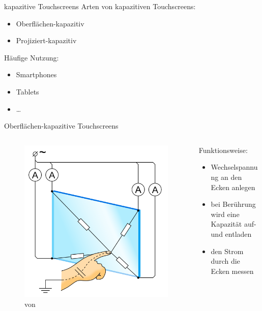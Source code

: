 \documentclass[12pt, aspectratio=169]{beamer}
\begin{document}
	\begin{frame}{kapazitive Touchscreens}
		Arten von kapazitiven Touchscreens:
		\begin{itemize}
			\item Oberflächen-kapazitiv
			\item Projiziert-kapazitiv
		\end{itemize}
		\medskip
		Häufige Nutzung:
		\begin{itemize}
			\item Smartphones
			\item Tablets
			\item \dots
		\end{itemize}
	\end{frame}

	\begin{frame}{Oberflächen-kapazitive Touchscreens}
		\begin{columns}
			\begin{column}{0.4\textwidth}
				\begin{figure}
					\includegraphics[max width=.9\textwidth,max height=.9\textheight]{../Images/SurfaceCapacitiveTouchScreen.png}
					\caption*{\tiny von }
				\end{figure}
			\end{column}
			\begin{column}{0.6\textwidth}
				Funktionsweise:
				\begin{itemize}
					\item<+-> Wechselspannung an den Ecken anlegen
					\item<+-> bei Berührung wird eine Kapazität auf- und entladen
					\item<+-> den Strom durch die Ecken messen
				\end{itemize}
			\end{column}
		\end{columns}
	\end{frame}
	
\end{document}
